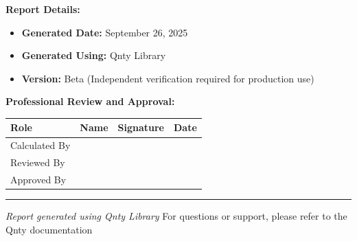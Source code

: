 \documentclass[11pt,a4paper]{article}
\begin{document}
\vspace{1em}

\noindent\textbf{Report Details:}
\begin{itemize}
\item \textbf{Generated Date:} September 26, 2025
\item \textbf{Generated Using:} Qnty Library
\item \textbf{Version:} Beta (Independent verification required for production use)
\end{itemize}

\vspace{2em}

\noindent\textbf{Professional Review and Approval:}

\vspace{1em}

\begin{longtable}{|p{3cm}|p{4cm}|p{4cm}|p{2.5cm}|}
\hline
\textbf{Role} & \textbf{Name} & \textbf{Signature} & \textbf{Date} \\
\hline
\hline
Calculated By & \rule{0pt}{1.5cm} & & \\
\hline
Reviewed By & \rule{0pt}{1.5cm} & & \\
\hline
Approved By & \rule{0pt}{1.5cm} & & \\
\hline
\end{longtable}

\vspace{1em}

\begin{center}
\rule{\textwidth}{0.4pt}
\vspace{0.5em}
\textit{Report generated using Qnty Library}
\vspace{0.5em}
{\footnotesize For questions or support, please refer to the Qnty documentation}
\end{center}
\end{document}
